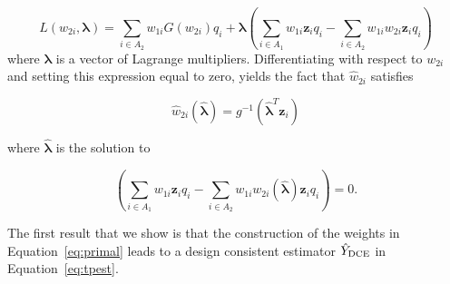 \documentclass[12pt]{article}
\renewcommand{\bf}[1]{\mathbf{#1}}
\begin{document}
\begin{equation}\label{eq:legragedc1}
  L(w_{2i}, \bm \lambda) = \sum_{i \in A_2} w_{1i} G(w_{2i}) q_i 
  + \bm \lambda \left( \sum_{i \in A_1} w_{1i} \bf z_i q_i -
    \sum_{i \in A_2} w_{1i} w_{2i} \bf z_i q_i\right)
\end{equation}
where $\bm \lambda$ is a vector of Lagrange multipliers.
Differentiating with respect to $w_{2i}$ and setting this expression equal to
zero, yields the fact that $\hat w_{2i}$ satisfies 

$$ \hat w_{2i}(\hat{\bm \lambda}) = g^{-1}(\hat{\bm \lambda}^T \bf z_i) $$

where $\hat{\bm \lambda}$ is the solution to

\begin{equation}\label{eq:lamdc1}
  \left( \sum_{i \in A_1} w_{1i} \bf z_i q_i -
  \sum_{i \in A_2} w_{1i} w_{2i}(\hat{\bm \lambda}) \bf z_i q_i\right) = 0.
\end{equation}

The first result that we show is that the construction of the weights in
Equation~\ref{eq:primal} leads to a design consistent estimator 
$\hat Y_{\rm DCE}$ in Equation~\ref{eq:tpest}.
\end{document}

